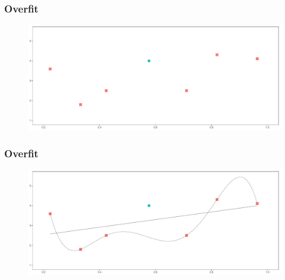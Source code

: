 \documentclass[
  shownotes,
  xcolor={svgnames},
  hyperref={colorlinks,citecolor=DarkBlue,linkcolor=DarkRed,urlcolor=DarkBlue}
  , aspectratio=169]{beamer}
\begin{document}
\begin{frame}
\frametitle{Overfit}


        \begin{figure}[H] \centering
            \captionsetup{justification=centering}
              \includegraphics[scale=0.4]{figures/fig_1g.pdf}
 \end{figure}

\end{frame}
\begin{frame}
\frametitle{Overfit}


        \begin{figure}[H] \centering
            \captionsetup{justification=centering}
              \includegraphics[scale=0.4]{figures/fig_1h.pdf}
 \end{figure}

\end{frame}
\end{document}
